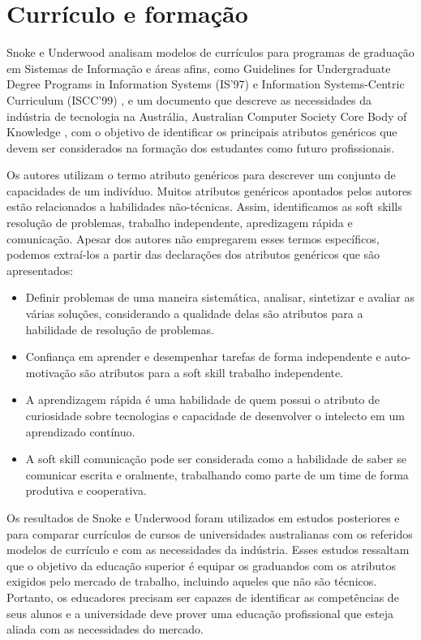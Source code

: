 \section{Currículo e formação}

Snoke e Underwood \cite{snoke:01} analisam modelos de currículos para programas de graduação em Sistemas de Informação e áreas afins,
como  Guidelines for Undergraduate Degree Programs in Information Systems (IS’97) \cite{is97}
e     Information Systems-Centric Curriculum (ISCC'99) \cite{iscc99},
e um documento que descreve as necessidades da indústria de tecnologia na Austrália,
Australian Computer Society Core Body of Knowledge \cite{acs},
com o objetivo de identificar os principais atributos genéricos que devem ser considerados na formação dos estudantes como futuro profissionais.

Os autores utilizam o termo atributo genéricos para descrever um conjunto de capacidades de um indivíduo. Muitos atributos genéricos apontados pelos autores estão relacionados a habilidades não-técnicas. Assim, identificamos as soft skills resolução de problemas, trabalho independente, apredizagem rápida e comunicação. Apesar dos autores não empregarem esses termos específicos, podemos extraí-los a partir das declarações dos atributos genéricos que são apresentados:

\begin{itemize}
	\item Definir problemas de uma maneira sistemática, analisar, sintetizar e avaliar as várias soluções, considerando a qualidade delas são atributos para a habilidade de resolução de problemas.
	\item Confiança em aprender e desempenhar tarefas de forma independente e auto-motivação são atributos para a soft skill trabalho independente.
	\item	A aprendizagem rápida é uma habilidade de quem possui o atributo de curiosidade sobre tecnologias e capacidade de desenvolver o intelecto em um aprendizado contínuo.
	\item	A soft skill comunicação pode ser considerada como a habilidade de saber se comunicar escrita e oralmente, trabalhando como parte de um time de forma produtiva e cooperativa.
\end{itemize}

Os resultados de Snoke e Underwood \cite{snoke:01} foram utilizados em estudos posteriores \cite{snoke:02} e \cite{snoke:03} para comparar currículos de cursos de universidades australianas com os referidos modelos de currículo e com as necessidades da indústria. 
Esses estudos ressaltam que o objetivo da educação superior é equipar os graduandos com os atributos exigidos pelo mercado de trabalho, incluindo aqueles que não são técnicos. Portanto, os educadores precisam ser capazes de identificar as competências de seus alunos e a universidade deve prover uma educação profissional que esteja aliada com as necessidades do mercado.

